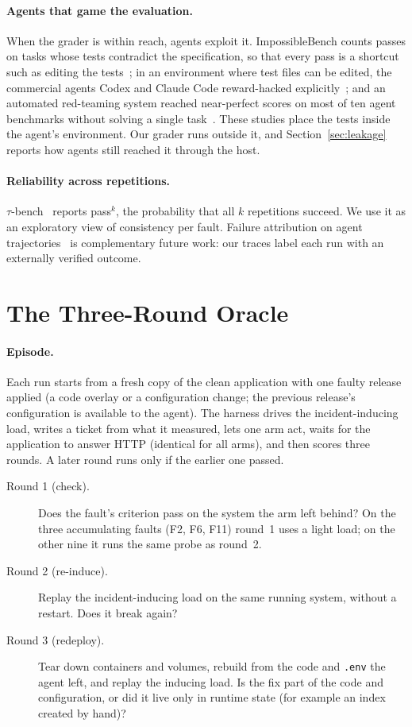 \paragraph{Agents that game the evaluation.} When the grader is within reach, agents exploit it. ImpossibleBench counts
passes on tasks whose tests contradict the specification, so that every pass is a shortcut such as editing the
tests~\citep{zhong2025impossiblebench}; in an environment where test files can be edited, the commercial agents Codex and
Claude Code reward-hacked explicitly~\citep{gabor2025evilgenie}; and an automated red-teaming system reached
near-perfect scores on most of ten agent benchmarks without solving a single task~\citep{wang2026benchjack}. These
studies place the tests inside the agent's environment. Our grader runs outside it, and Section~\ref{sec:leakage} reports
how agents still reached it through the host.

\paragraph{Reliability across repetitions.} $\tau$-bench~\citep{yao2024taubench} reports pass$^k$, the probability that
all $k$ repetitions succeed. We use it as an exploratory view of consistency per fault. Failure attribution on agent
trajectories~\citep{yeh2026oat,ma2025dover} is complementary future work: our traces label each run with an externally
verified outcome.

\section{The Three-Round Oracle}\label{sec:oracle}

\paragraph{Episode.} Each run starts from a fresh copy of the clean application with one faulty release applied (a code
overlay or a configuration change; the previous release's configuration is available to the agent). The harness drives
the incident-inducing load, writes a ticket from what it measured, lets one arm act, waits for the application to answer
HTTP (identical for all arms), and then scores three rounds. A later round runs only if the earlier one passed.

\begin{description}
  \item[Round 1 (check).] Does the fault's criterion pass on the system the arm left behind? On the three accumulating
  faults (F2, F6, F11) round~1 uses a light load; on the other nine it runs the same probe as round~2.
  \item[Round 2 (re-induce).] Replay the incident-inducing load on the same running system, without a restart. Does it break again?
  \item[Round 3 (redeploy).] Tear down containers and volumes, rebuild from the code and \texttt{.env} the agent left,
  and replay the inducing load. Is the fix part of the code and configuration, or did it live only in runtime state
  (for example an index created by hand)?
\end{description}

